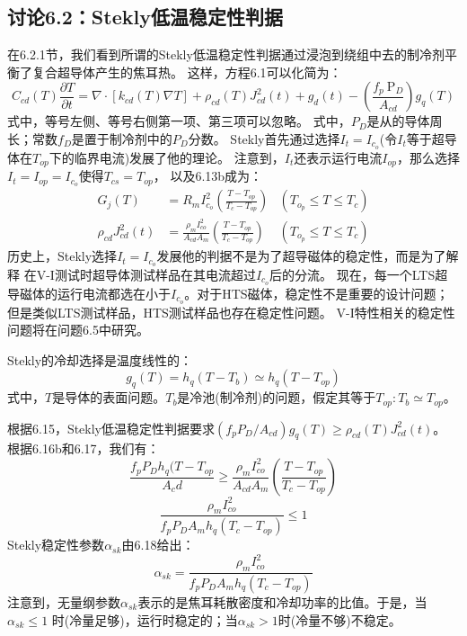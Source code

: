 \subsection{讨论6.2：Stekly低温稳定性判据}
在6.2.1节，我们看到所谓的Stekly低温稳定性判据通过浸泡到绕组中去的制冷剂平衡了复合超导体产生的焦耳热。
这样，方程6.1可以化简为：
\begin{equation}%
C_{cd}(T)\frac {\partial T}{\partial t}=\nabla\cdot[k_{cd}(T)\nabla T]+\rho _{cd}(T)J_{cd}^2(t)+g_d(t)-(\frac{f_p\ \mathrm{P}_D}{A_{cd}})g_q(T)
\end{equation}
式中，等号左侧、等号右侧第一项、第三项可以忽略。
式中，$P_D$是从的导体周长；常数$f_D$是置于制冷剂中的$P_D$分数。
Stekly首先通过选择$I_t=I_{c_o}$(令$I_t$等于超导体在$T_{op}$下的临界电流)发展了他的理论。
注意到，$I_t$还表示运行电流$I_{op}$，那么选择$I_t=I_{op}=I_{c_o}$使得$T_{cs}=T_{op}$，
以及6.13b成为：
\begin{subequations}
	\begin{align}
	G_j(T)&=R_mI_{c_o}^2(\frac{T-T_{op}}{T_c-T_{op}}) &(T_{o_p}\leq T \leq T_c)\\
	\rho_{cd}J^2_{cd}(t)&=\frac{\rho_{m}I_{co}^2}{A_{cd}A_m}
	(\frac{T-T_{op}}{T_c-T_{op}}) &(T_{o_p}\leq T \leq T_c)
	\end{align}
\end{subequations}
历史上，Stekly选择$I_t=I_{c_o}$发展他的判据不是为了超导磁体的稳定性，而是为了解释
在V-I测试时超导体测试样品在其电流超过$I_{c_o}$后的分流。
现在，每一个LTS超导磁体的运行电流都选在小于$I_{c_o}$。对于HTS磁体，稳定性不是重要的设计问题；
但是类似LTS测试样品，HTS测试样品也存在稳定性问题。
V-I特性相关的稳定性问题将在问题6.5中研究。

Stekly的冷却选择是温度线性的：
\begin{equation}%
g_q(T)=h_q(T-T_b)\simeq h_q(T-T_{op})
\end{equation}
式中，$T$是导体的表面问题。$T_b$是冷池(制冷剂)的问题，假定其等于$T_{op}:T_b\simeq T_{op}$。

根据6.15，Stekly低温稳定性判据要求$(f_p P_D/A_{cd})g_q(T)\ge \rho_{cd}(T)J_{cd}^2(t)$。
根据6.16b和6.17，我们有：
\begin{equation*}%
\frac{f_pP_Dh_q(T-T_{op}}{A_cd}\geq \frac{\rho_m I_{co}^2}{A_{cd}A_m}(\frac{T-T_{op}}{T_c-T_{op}})
\end{equation*}
\begin{equation}%
\frac{\rho_m I_{co}^2}{f_pP_DA_mh_q(T_c-T_{op})}\leq 1
\end{equation}
Stekly稳定性参数$\alpha_{sk}$由6.18给出：
\begin{equation}%
\alpha_{sk}=\frac{\rho_m I_{co}^2}{f_pP_DA_mh_q(T_c-T_{op})}
\end{equation}
注意到，无量纲参数$\alpha_{sk}$表示的是焦耳耗散密度和冷却功率的比值。于是，当$\alpha_{sk}\le 1$
时(冷量足够)，运行时稳定的；当$\alpha_{sk}> 1$时(冷量不够)不稳定。

